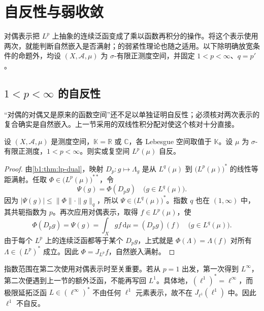 \section{自反性与弱收敛}
\label{b1:sec:1004}

对偶表示把 \(L^p\) 上抽象的连续泛函变成了乘以函数再积分的操作。将这个表示使用两次，就能判断自然嵌入是否满射；的弱紧性理论也随之适用。以下除明确放宽条件的命题外，均设 \((X,\mathcal A,\mu)\) 为 \(\sigma\)-有限正测度空间，并固定 \(1<p<\infty\)、\(q=p'\)。


\subsection{\texorpdfstring{\(1<p<\infty\)}{1<p<∞} 的自反性}
\label{b1:subsec:100401}

“对偶的对偶又是原来的函数空间”还不足以单独证明自反性；必须核对两次表示的复合确实是自然嵌入。上一节采用的双线性积分配对使这个核对十分直接。

\begin{theorem}\label{b1:thm:lp-reflexive}
设 \((X,\mathcal A,\mu)\) 是测度空间，\(\mathbb K=\mathbb R\) 或 \(\mathbb C\)，各 Lebesgue 空间取值于 \(\mathbb K\)。设 \(\mu\) 为 \(\sigma\)-有限正测度，\(1<p<\infty\)。则实或复空间 \(L^p(\mu)\) 自反。
\end{theorem}
\begin{proof}
由\cref{b1:thm:lp-dual}，映射 \(D_p:g\mapsto\Lambda_g\) 是从 \(L^q(\mu)\) 到 \(\bigl(L^p(\mu)\bigr)^*\) 的线性等距满射。任取
\(\Phi\in\bigl(L^p(\mu)\bigr)^{**}\)，令
\[
 \Psi(g)=\Phi(D_pg)\quad\bigl(g\in L^q(\mu)\bigr).
\]
因为 \(|\Psi(g)|\le\|\Phi\|\cdot\|g\|_q\)，所以 \(\Psi\in\bigl(L^q(\mu)\bigr)^*\)。指数 \(q\) 也在 \((1,\infty)\) 中，其共轭指数为 \(p\)。再次应用对偶表示，取得 \(f\in L^p(\mu)\)，使
\[
 \Phi(D_pg)=\Psi(g)=\int_Xgf\,\mathrm d\mu
 =(D_pg)(f)\quad\bigl(g\in L^q(\mu)\bigr).
\]
由于每个 \(L^p\) 上的连续泛函都等于某个 \(D_pg\)，上式就是
\(\Phi(\Lambda)=\Lambda(f)\) 对所有 \(\Lambda\in(L^p)^*\) 成立。因此 \(\Phi=J_{L^p}f\)，自然嵌入满射。
\end{proof}

指数范围在第二次使用对偶表示时至关重要。若从 \(p=1\) 出发，第一次得到 \(L^\infty\)，第二次便遇到上一节的额外泛函，不能再写回 \(L^1\)。具体地，\((\ell^1)^*=\ell^\infty\)，而极限延拓泛函 \(L\in(\ell^\infty)^*\) 不由任何 \(\ell^1\) 元素表示，故不在 \(J_{\ell^1}(\ell^1)\) 中。因此 \(\ell^1\) 不自反。

